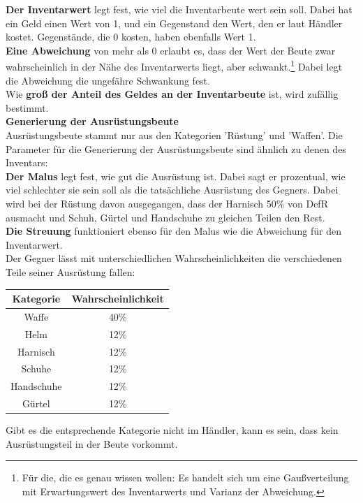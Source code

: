 \documentclass[11pt, a4paper, german]{article}
\begin{document}
\textbf{Der Inventarwert} legt fest, wie viel die Inventarbeute wert sein soll. Dabei hat ein Geld einen Wert von 1, und ein Gegenstand den Wert, den er laut Händler kostet. Gegenstände, die 0 kosten, haben ebenfalls Wert 1.\\

\textbf{Eine Abweichung} von mehr als 0 erlaubt es, dass der Wert der Beute zwar wahrscheinlich in der Nähe des Inventarwerts liegt, aber schwankt.\footnote{Für die, die es genau wissen wollen: Es handelt sich um eine Gaußverteilung mit Erwartungswert des Inventarwerts und Varianz der Abweichung.} Dabei legt die Abweichung die ungefähre Schwankung fest.\\

Wie \textbf{groß der Anteil des Geldes an der Inventarbeute} ist, wird zufällig bestimmt.\\

\textbf{Generierung der Ausrüstungsbeute}\\

Ausrüstungsbeute stammt nur aus den Kategorien 'Rüstung' und 'Waffen'. 
Die Parameter für die Generierung der Ausrüstungsbeute sind ähnlich zu denen des Inventars:\\

\textbf{Der Malus} legt fest, wie gut die Ausrüstung ist. Dabei sagt er prozentual, wie viel schlechter sie sein soll als die tatsächliche Ausrüstung des Gegners. Dabei wird bei der Rüstung davon ausgegangen, dass der Harnisch 50\% von DefR ausmacht und Schuh, Gürtel und Handschuhe zu gleichen Teilen den Rest.\\

\textbf{Die Streuung} funktioniert ebenso für den Malus wie die Abweichung für den Inventarwert.\\

Der Gegner lässt mit unterschiedlichen Wahrscheinlichkeiten die verschiedenen Teile seiner Ausrüstung fallen:\\
\begin{center}
\begin{tabular}{c|c}
Kategorie & Wahrscheinlichkeit\\
\hline
Waffe & 40\% \\
Helm & 12\% \\
Harnisch & 12\% \\
Schuhe & 12\% \\
Handschuhe & 12\% \\
Gürtel & 12\% \\
\end{tabular}
\end{center}
Gibt es die entsprechende Kategorie nicht im Händler, kann es sein, dass kein Ausrüstungsteil in der Beute vorkommt.
\end{document}
